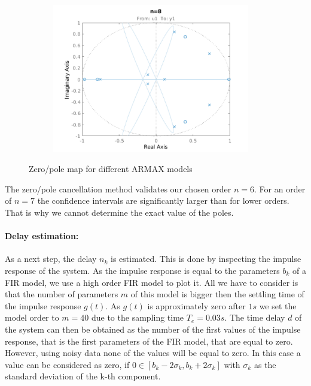 \begin{figure}[h]
\begin{subfigure}{.49\textwidth}
		\label{fig:zp7}
	\end{subfigure}\hfill
	\begin{subfigure}{.49\textwidth}
		\includegraphics[height=6.5cm]{figures/zp8.pdf}
		\label{fig:zp8}
	\end{subfigure}
	\caption{Zero/pole map for different ARMAX models}
	\label{fig:zero_pole}
\end{figure}

The zero/pole cancellation method validates our chosen order $n=6$. For an order of $n=7$ the confidence intervals are significantly larger than for lower orders. That is why we cannot determine the exact value of the poles. \\

\paragraph{Delay estimation:} As a next step, the delay $n_k$ is estimated. This is done by inspecting the impulse response of the system. As the impulse response is equal to the parameters $b_k$ of a FIR model, we use a high order FIR model to plot it. All we have to consider is that the number of parameters $m$ of this model is bigger then the settling time of the impulse response $g(t)$. As $g(t)$ is approximately zero after $ 1 s$ we set the model order to $m = 40$ due to the sampling time $T_e = 0.03 s$.
The time delay $d$ of the system can then be obtained as the number of the first values of the impulse response, that is the first parameters of the FIR model, that are equal to zero. 
However, using noisy data none of the values will be equal to zero. In this case a value can be considered as zero, if $ 0 \in \left[b_k -2 \sigma_k, b_k + 2\sigma_k \right] $ with $\sigma_k$ as the standard deviation of the k-th component. 

